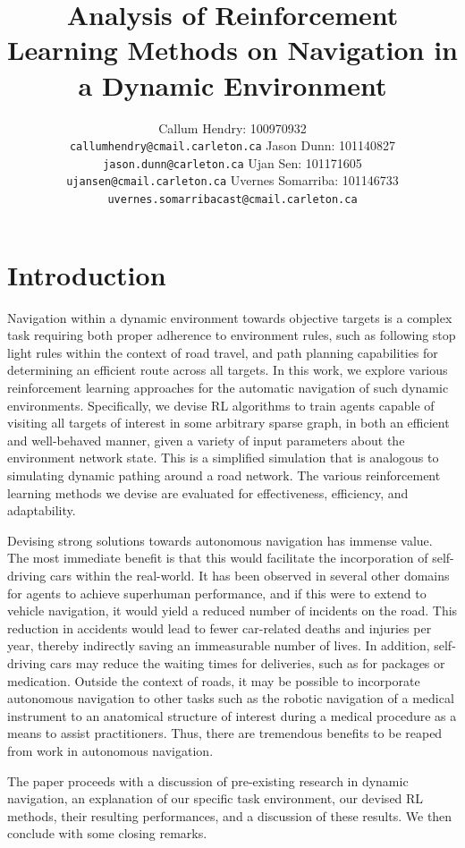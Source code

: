 \documentclass{article}
\title{Analysis of Reinforcement Learning Methods on Navigation in a Dynamic Environment}
\author{
	Callum Hendry: 100970932\\
	\texttt{callumhendry@cmail.carleton.ca}
	\And
	Jason Dunn: 101140827\\
	\texttt{jason.dunn@carleton.ca}
	\And
	Ujan Sen: 101171605\\
	\texttt{ujansen@cmail.carleton.ca}
	\And
	Uvernes Somarriba: 101146733\\
	\texttt{uvernes.somarribacast@cmail.carleton.ca}
}
\begin{document}
	
	
	\maketitle
	
	\section{Introduction}
	Navigation within a dynamic environment towards objective targets is a complex task requiring both proper adherence to environment rules, such as following stop light rules within the context of road travel, and path planning capabilities for determining an efficient route across all targets. In this work, we explore various reinforcement learning approaches for the automatic navigation of such dynamic environments. Specifically, we devise RL algorithms to train agents capable of visiting all targets of interest in some arbitrary sparse graph, in both an efficient and well-behaved manner, given a variety of input parameters about the environment network state. This is a simplified simulation that is analogous to simulating dynamic pathing around a road network. The various reinforcement learning methods we devise are evaluated for effectiveness, efficiency, and adaptability.
	
	Devising strong solutions towards autonomous navigation has immense value. The most immediate benefit is that this would facilitate the incorporation of self-driving cars within the real-world. It has been observed in several other domains for agents to achieve superhuman performance, and if this were to extend to vehicle navigation, it would yield a reduced number of incidents on the road. This reduction in accidents would lead to fewer car-related deaths and injuries per year, thereby indirectly saving an immeasurable number of lives. In addition, self-driving cars may reduce the waiting times for deliveries, such as for packages or medication. Outside the context of roads, it may be possible to incorporate autonomous navigation to other tasks such as the robotic navigation of a medical instrument to an anatomical structure of interest during a medical procedure as a means to assist practitioners. Thus, there are tremendous benefits to be reaped from work in autonomous navigation. 
	
	The paper proceeds with a discussion of pre-existing research in dynamic navigation, an explanation of our specific task environment, our devised RL methods, their resulting performances, and a discussion of these results. We then conclude with some closing remarks.
	
\end{document}
